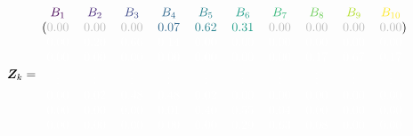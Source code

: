 \scriptsize
$$
\design_k = \begin{blockarray}{cccccccccc}
\color[HTML]{440154}B_{1} & \color[HTML]{482878}B_{2} & \color[HTML]{3E4A89}B_{3} & \color[HTML]{31688E}B_{4} & \color[HTML]{26828E}B_{5} & \color[HTML]{1F9E89}B_{6} & \color[HTML]{35B779}B_{7} & \color[HTML]{6DCD59}B_{8} & \color[HTML]{B4DE2C}B_{9} & \color[HTML]{FDE725}B_{10} \\
\begin{block}{(cccccccccc)}
\color{lightgray}0.00 & \color{lightgray}0.00 & \color{lightgray}0.00 & \color[HTML]{31688E}0.07 & \color[HTML]{26828E}0.62 & \color[HTML]{1F9E89}0.31 & \color{lightgray}0.00 & \color{lightgray}0.00 & \color{lightgray}0.00 & \color{lightgray}0.00\color{black}\\
  
\end{block}
\color{white}0.00 & \color{white}0.20 & \color{white}0.66 & \color{white}0.14 & \color{white}0.00 & \color{white}0.00 & \color{white}0.00 & \color{white}0.00 & \color{white}0.00 & \color{white}0.00\color{black}\\
  \color{white}0.00 & \color{white}0.00 & \color{white}0.00 & \color{white}0.00 & \color{white}0.00 & \color{white}0.00 & \color{white}0.00 & \color{white}0.17 & \color{white}0.67 & \color{white}0.17\color{black}\\
  \color{white}\vdots & \color{white}\vdots & \color{white}\vdots & \color{white}\vdots & \color{white}\vdots & \color{white}\vdots & \color{white}\vdots & \color{white}\vdots & \color{white}\vdots & \color{white}\vdots\\
  \color{white}0.00 & \color{white}0.02 & \color{white}0.48 & \color{white}0.48 & \color{white}0.02 & \color{white}0.00 & \color{white}0.00 & \color{white}0.00 & \color{white}0.00 & \color{white}0.00\color{black}\\
  \color{white}0.00 & \color{white}0.00 & \color{white}0.00 & \color{white}0.01 & \color{white}0.40 & \color{white}0.55 & \color{white}0.04 & \color{white}0.00 & \color{white}0.00 & \color{white}0.00\color{black}\\
  \color{white}0.00 & \color{white}0.00 & \color{white}0.00 & \color{white}0.00 & \color{white}0.00 & \color{white}0.29 & \color{white}0.63 & \color{white}0.08 & \color{white}0.00 & \color{white}0.00\color{black}
\end{blockarray}
$$
\normalsize
